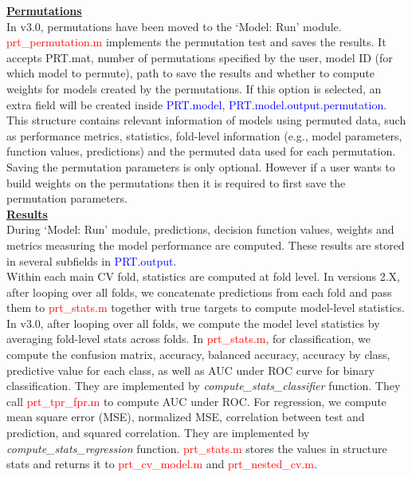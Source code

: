 \noindent \textbf{\underline{Permutations}}
\\

In v3.0, permutations have been moved to the `Model: Run' module. \textcolor{red}{prt\_permutation.m} implements the permutation test and saves the results. It accepts PRT.mat, number of permutations specified by the user, model ID (for which model to permute), path to save the results and whether to compute weights for models created by the permutations. If this option is selected, an extra field will be created inside \textcolor{blue}{PRT.model}, \textcolor{blue}{PRT.model.output.permutation}. This structure contains relevant information of models using permuted data, such as performance metrics, statistics, fold-level information (e.g., model parameters, function values, predictions) and the permuted data used for each permutation. Saving the permutation parameters is only optional. However if a user wants to build weights on the permutations then it is required to first save the permutation parameters. 
\\


\noindent \textbf{\underline{Results}}
\\

During `Model: Run' module, predictions, decision function values, weights and metrics measuring the model performance are computed. These results are stored in several subfields in \textcolor{blue}{PRT.output}.
\\

Within each main CV fold, statistics are computed at fold level. In versions 2.X, after looping over all folds, we concatenate predictions from each fold and pass them to \textcolor{red}{prt\_stats.m} together with true targets to compute model-level statistics. In v3.0, after looping over all folds, we compute the model level statistics by averaging fold-level stats across folds. In \textcolor{red}{prt\_stats.m}, for classification, we compute the confusion matrix, accuracy, balanced accuracy, accuracy by class, predictive value for each class, as well as AUC under ROC curve for binary classification. They are implemented by \textit{compute\_stats\_classifier} function. They call \textcolor{red}{prt\_tpr\_fpr.m} to compute AUC under ROC. For regression, we compute mean square error (MSE), normalized MSE, correlation between test and prediction, and squared correlation. They are implemented by \textit{compute\_stats\_regression} function. \textcolor{red}{prt\_stats.m} stores the values in structure stats and returns it to \textcolor{red}{prt\_cv\_model.m} and \textcolor{red}{prt\_nested\_cv.m}. 



